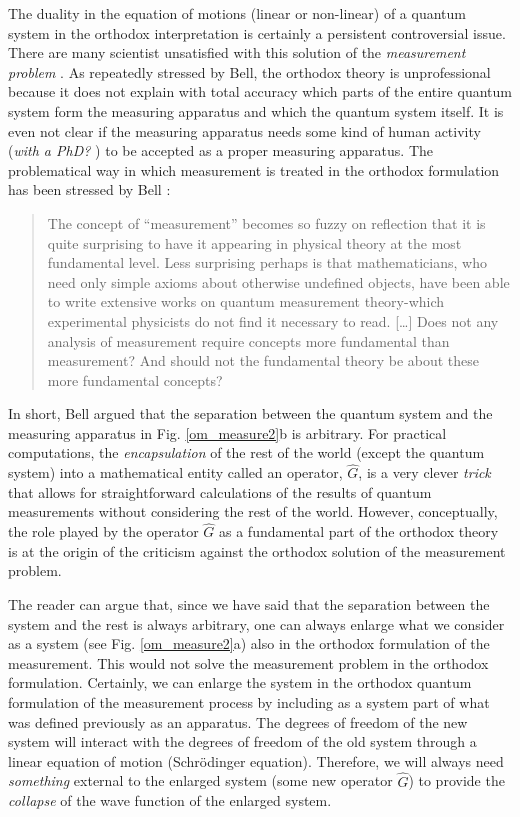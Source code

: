 \documentclass[nofootinbib, secnumarabic, amsmath, nobibnotes,10pt,aps,pra]{revtex4-1}
\newcommand{\fref}[1]{Fig. \ref{#1}}
\begin{document}
The duality in the equation of motions (linear or non-linear) of a quantum system in the orthodox interpretation is certainly a persistent controversial issue. There are many scientist unsatisfied with this solution of the \textit{measurement problem} \cite{om.bell1990}. As repeatedly stressed by Bell, the orthodox theory is unprofessional because it does not explain with total accuracy which parts of the entire quantum system form the measuring apparatus and which the quantum system itself. It is even not clear if the measuring apparatus needs some kind of human activity (\textit{with a PhD?} \cite{om.bell1990}) to be accepted as a proper measuring apparatus. The problematical way in which measurement is treated in the orthodox formulation has been stressed by Bell \cite{om.Bell1987}:
\begin{quote}
The concept of ``measurement'' becomes so fuzzy on reflection that it is quite surprising to have it appearing in physical theory at the most fundamental level. Less surprising perhaps is that mathematicians, who need only simple axioms about otherwise undefined objects, have been able to write extensive works on quantum measurement theory-which experimental physicists do not find it necessary to read. [\ldots] Does not any analysis of measurement require concepts more fundamental than measurement? And should not the fundamental theory be about these more fundamental concepts?
\end{quote}
In short, Bell argued that the separation between the quantum
system and the measuring apparatus in \fref{om_measure2}b is
arbitrary. For practical computations, the \textit{encapsulation} of the rest of the world (except
the quantum system) into a mathematical entity called an operator,
$\hat{G}$\!, is a very clever \textit{trick} that allows for
straightforward calculations of the results of quantum measurements
\cite{om.Durrnaive,om.goldstein} without considering the rest of
the  world. However, conceptually, the role played by the operator $\hat{G}$ as a fundamental 
part of the orthodox theory is at the origin of the criticism against the orthodox solution of the measurement problem. 

The reader can argue that, since we have said that the separation between the system and the rest is always arbitrary, one can always enlarge what we consider as a system (see \fref{om_measure2}a) also in the orthodox formulation of the measurement. This would not solve the measurement problem in the orthodox formulation.
Certainly, we can enlarge the system in the orthodox quantum formulation of the measurement process by including as a system part of what was defined previously as an apparatus. The degrees of freedom of the new system will interact with the degrees of freedom of the old system through a linear equation of motion (Schr\"odinger equation). Therefore, we will always need \emph{something} external to the enlarged system (some new operator $\hat{G}$\!) to provide the \textit{collapse} of the wave function of the enlarged system.  
\end{document}
